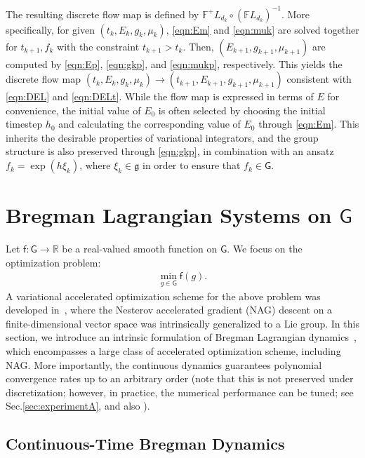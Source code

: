\documentclass[letterpaper, 10pt, conference]{ieeeconf}
\newcommand{\G}{\ensuremath{\mathsf{G}}}
\renewcommand{\Re}{\ensuremath{\mathbb{R}}}
\newcommand{\g}{\ensuremath{\mathfrak{g}}}
\begin{document}
The resulting discrete flow map is defined by $\mathbb{F}^+L_{d_k} \circ (\mathbb{F}L_{d_k})^{-1}$. 
More specifically, for given $(t_k, E_k, g_k, \mu_k)$, \eqref{eqn:Em} and \eqref{eqn:muk} are solved together for $t_{k+1},f_k$ with the constraint $t_{k+1}>t_k$.
Then, $(E_{k+1}, g_{k+1},\mu_{k+1})$ are computed by \eqref{eqn:Ep}, \eqref{eqn:gkp}, and \eqref{eqn:mukp}, respectively.
This yields the discrete flow map $(t_k, E_k, g_k, \mu_k)\rightarrow(t_{k+1}, E_{k+1}, g_{k+1}, \mu_{k+1})$ consistent with \eqref{eqn:DEL} and \eqref{eqn:DELt}.
While the flow map is expressed in terms of $E$ for convenience, the initial value of $E_0$ is often selected by choosing the initial timestep $h_0$ and calculating the corresponding value of $E_0$ through \eqref{eqn:Em}.
This inherits the desirable properties of variational integrators, and the group structure is also preserved through \eqref{eqn:gkp}, in combination with an ansatz $f_k=\exp(h\xi_k)$, where $\xi_k\in\g$ in order to ensure that $f_k\in\G$.

\section{Bregman Lagrangian Systems on $\G$}\label{sec:Breg}

\newcommand{\obj}{\mathsf{f}}

Let $\obj:\G\rightarrow\Re$ be a real-valued smooth function on $\G$.
We focus on the optimization problem:
\begin{align}
    \min_{g\in\G} \obj (g).
\end{align}
A variational accelerated optimization scheme for the above problem was developed in~\cite{tao2020variational}, where the Nesterov accelerated gradient (NAG) descent on a finite-dimensional vector space was intrinsically generalized to a Lie group. 
In this section, we introduce an intrinsic formulation of Bregman Lagrangian dynamics~\cite{wibisono2016variational}, which encompasses a large class of accelerated optimization scheme, including NAG.
More importantly, the continuous dynamics guarantees polynomial convergence rates up to an arbitrary order (note that this is not preserved under discretization; however, in practice, the numerical performance can be tuned; see Sec.\ref{sec:experimentA}, \cite{su2016differential} and also \cite{attouch2018fast}).

\subsection{Continuous-Time Bregman Dynamics}
\end{document}
